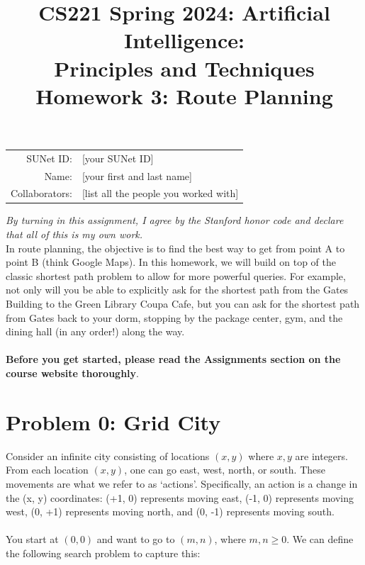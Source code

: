 \documentclass{article}
\title{\textbf{CS221 Spring 2024: Artificial Intelligence:\\ Principles and Techniques} \\Homework 3: Route Planning}
\date{}
\theoremstyle{case}
\theoremstyle{definition}
\begin{document}
\maketitle

\begin{center}
\begin{tabular}{rl}
SUNet ID: & [your SUNet ID] \\
Name: & [your first and last name] \\
Collaborators: & [list all the people you worked with]
\end{tabular}
\end{center}
\textit{By turning in this assignment, I agree by the Stanford honor code and declare
that all of this is my own work.} \\
\fontsize{12pt}{16pt}\selectfont
In route planning, the objective is to find the best way to get from point A to point B (think Google Maps).
  In this homework, we will build on top of the classic shortest path problem to allow for more powerful queries. For
  example, not only will you be able to explicitly ask for the shortest path from the Gates Building to the Green Library Coupa Cafe, but you can ask for the shortest path from Gates back to your dorm, stopping by the package center,
  gym, and the dining hall (in any order!) along the way. \\ 
  \\
\textbf{Before you get started, please read the Assignments section on the course website thoroughly}.


\section*{Problem 0: Grid City}

Consider an infinite city consisting of locations $(x,y)$ where $x, y$ are integers.
  From each location $(x,y)$, one can go east, west, north, or south. 
  These movements are what we refer to as ‘actions’. 
  Specifically, an action is a change in the (x, y) coordinates: (+1, 0) represents moving east, (-1, 0) 
  represents moving west, (0, +1) represents moving north, and (0, -1) represents moving south.
  \\
  \\
  You start at $(0,0)$ and want to go to $(m, n)$, where $m, n \geq 0$.
  We can define the following search problem to capture this:
 
\end{document}
